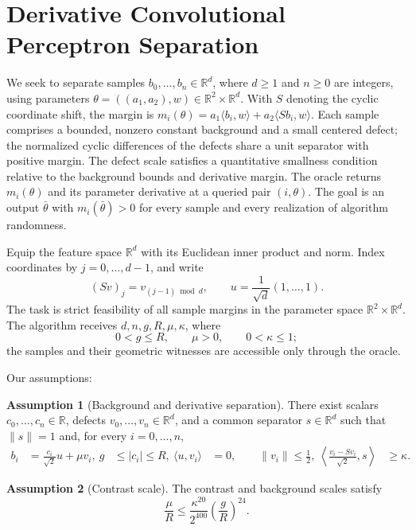 \documentclass[10pt]{article}
\theoremstyle{definition}
\newtheorem{assumption}{Assumption}
\begin{document}
\section*{Derivative Convolutional Perceptron Separation}
We seek to separate samples $b_0,\ldots,b_n\in\mathbb{R}^d$, where $d\geq1$ and $n\geq0$ are integers, using parameters $\theta=((a_1,a_2),w)\in\mathbb{R}^2\times\mathbb{R}^d$. With $S$ denoting the cyclic coordinate shift, the margin is $m_i(\theta)=a_1\langle b_i,w\rangle+a_2\langle Sb_i,w\rangle$. Each sample comprises a bounded, nonzero constant background and a small centered defect; the normalized cyclic differences of the defects share a unit separator with positive margin. The defect scale satisfies a quantitative smallness condition relative to the background bounds and derivative margin. The oracle returns $m_i(\theta)$ and its parameter derivative at a queried pair $(i,\theta)$. The goal is an output $\bar{\theta}$ with $m_i(\bar{\theta})>0$ for every sample and every realization of algorithm randomness.

Equip the feature space $\mathbb{R}^d$ with its Euclidean inner product and norm. Index coordinates by $j=0,\ldots,d-1$, and write
\[
(Sv)_j=v_{(j-1)\bmod d},
\qquad
u=\frac{1}{\sqrt d}(1,\ldots,1).
\]
The task is strict feasibility of all sample margins in the parameter space $\mathbb{R}^2\times\mathbb{R}^d$. The algorithm receives $d,n,g,R,\mu,\kappa$, where
\[
0<g\leq R,\qquad \mu>0,\qquad 0<\kappa\leq1;
\]
the samples and their geometric witnesses are accessible only through the oracle.

Our assumptions:
\begin{assumption}[Background and derivative separation]
There exist scalars $c_0,\ldots,c_n\in\mathbb{R}$, defects $v_0,\ldots,v_n\in\mathbb{R}^d$, and a common separator $s\in\mathbb{R}^d$ such that $\|s\|=1$ and, for every $i=0,\ldots,n$,
\[
\begin{aligned}
b_i&=\frac{c_i}{\sqrt2}u+\mu v_i,\
g&\leq |c_i|\leq R,\
\langle u,v_i\rangle&=0,\qquad \|v_i\|\leq\frac12,\
\left\langle\frac{v_i-Sv_i}{\sqrt2},s\right\rangle&\geq\kappa.
\end{aligned}
\]
\end{assumption}

\begin{assumption}[Contrast scale]
The contrast and background scales satisfy
\[
\frac{\mu}{R}\leq
\frac{\kappa^{20}}{2^{400}}\left(\frac{g}{R}\right)^{24}.
\]
\end{assumption}
\end{document}
